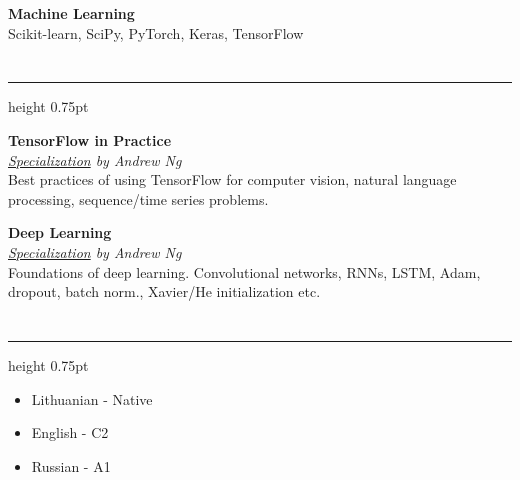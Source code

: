 \documentclass[fontsize=10pt]{article}
\let\oldsection\section
\renewcommand\section[1]{%
	\vspace{0.75\baselineskip}
    \oldsection{\color{Brown}{#1}}%
	\vspace{-0.5\baselineskip}
    \hrule height 0.75pt
    \vspace{0.75\baselineskip}
}
\begin{document}
\textbf{Machine Learning}\\
Scikit-learn, SciPy, PyTorch, Keras, TensorFlow


\section{Online Education}
 
 
{\large\textbf{TensorFlow in Practice}}\\
\textit{
	\href{https://www.deeplearning.ai/courses/tensorflow-developer-professional-certificate/}{Specialization} by Andrew Ng
}\\[5pt]
Best practices of using TensorFlow for computer vision, natural language processing,  sequence/time series problems.
\vspace*{0.5\baselineskip}

{\large\textbf{Deep Learning}}\\
\textit{
	\href{https://www.deeplearning.ai/courses/deep-learning-specialization/}{Specialization} by Andrew Ng
}\\[5pt]
Foundations of deep learning. Convolutional networks, RNNs, LSTM, Adam, dropout, batch norm., Xavier/He initialization etc.

\section{Communication skills}

\begin{itemize}
	\item Lithuanian - Native
	\item English - C2
	\item Russian - A1
\end{itemize}
\end{document}
